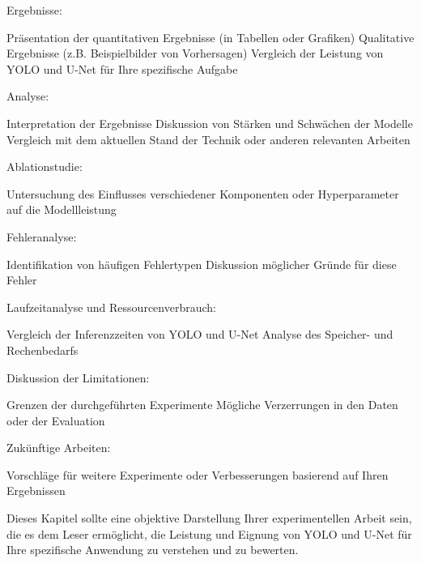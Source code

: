 Ergebnisse:

Präsentation der quantitativen Ergebnisse (in Tabellen oder Grafiken)
Qualitative Ergebnisse (z.B. Beispielbilder von Vorhersagen)
Vergleich der Leistung von YOLO und U-Net für Ihre spezifische Aufgabe


Analyse:

Interpretation der Ergebnisse
Diskussion von Stärken und Schwächen der Modelle
Vergleich mit dem aktuellen Stand der Technik oder anderen relevanten Arbeiten


Ablationstudie:

Untersuchung des Einflusses verschiedener Komponenten oder Hyperparameter auf die Modellleistung


Fehleranalyse:

Identifikation von häufigen Fehlertypen
Diskussion möglicher Gründe für diese Fehler


Laufzeitanalyse und Ressourcenverbrauch:

Vergleich der Inferenzzeiten von YOLO und U-Net
Analyse des Speicher- und Rechenbedarfs


Diskussion der Limitationen:

Grenzen der durchgeführten Experimente
Mögliche Verzerrungen in den Daten oder der Evaluation


Zukünftige Arbeiten:

Vorschläge für weitere Experimente oder Verbesserungen basierend auf Ihren Ergebnissen



Dieses Kapitel sollte eine objektive Darstellung Ihrer experimentellen Arbeit sein, die es dem Leser ermöglicht, die Leistung und Eignung von YOLO und U-Net für Ihre spezifische Anwendung zu verstehen und zu bewerten.